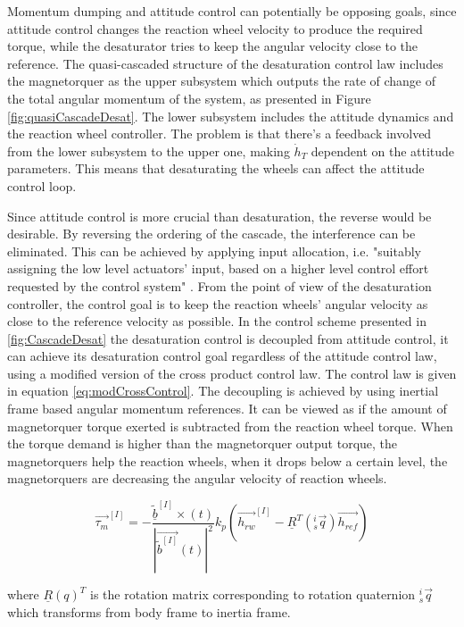 Momentum dumping and attitude control can potentially be opposing goals, since attitude control changes the reaction wheel velocity to produce the required torque, while the desaturator tries to keep the angular velocity close to the reference. The quasi-cascaded structure of the desaturation control law includes the magnetorquer as the upper subsystem which outputs the rate of change of the total angular momentum of the system, as presented in Figure \ref{fig:quasiCascadeDesat}. The lower subsystem includes the attitude dynamics and the reaction wheel controller. The problem is that there's a feedback involved from the lower subsystem to the upper one, making $\dot{h}_T$ dependent on the attitude parameters. This means that desaturating the wheels can affect the attitude control loop. 

Since attitude control is more crucial than desaturation, the reverse would be desirable.  By reversing the ordering of the cascade, the interference can be eliminated. This can be achieved by applying input allocation, i.e. "suitably assigning the low level actuators' input, based on a higher level control effort requested by the control system" \cite{JOHANSEN20131087}. From the point of view of the desaturation controller, the control goal is to keep the reaction wheels' angular velocity as close to the reference velocity as possible. In the control scheme presented in \ref{fig:CascadeDesat} the desaturation control is decoupled from attitude control, it can achieve its desaturation control goal regardless of the attitude control law, using a modified version of the cross product control law. The control law is given in equation \ref{eq:modCrossControl}. The decoupling is achieved by using inertial frame based angular momentum references. 		
It can be viewed as if the amount of magnetorquer torque exerted is subtracted from the reaction wheel torque. When the torque demand is higher than the magnetorquer output torque, the magnetorquers help the reaction wheels, when it drops below a certain level, the magnetorquers are decreasing the angular velocity of reaction wheels.

		
		\begin{equation}
		\label{eq:modCrossControl}
		\vec{\tau_m}^{[I]} = -\frac{\underline{\tilde{b}}^{[I]}\times(t)}{|\vec{\tilde{b}^{[I]}}(t) |^2} k_p\left(\vec{h_{rw}}^{[I]} - \underline{R}^T(^i_s\vec{ q})\vec{h_{ref}} \right)
		\end{equation}
		
		where $\underline{R}(q)^T$ is the rotation matrix corresponding to rotation quaternion $^i_s\vec{ q}$ which transforms from body frame to inertia frame.
		
